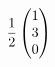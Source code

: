 \documentclass[preview]{standalone}
\begin{document}
\begin{align*}
{1 \over 2} \begin{pmatrix} 1 \\ 3 \\ 0 \end{pmatrix}
\end{align*}
\end{document}
